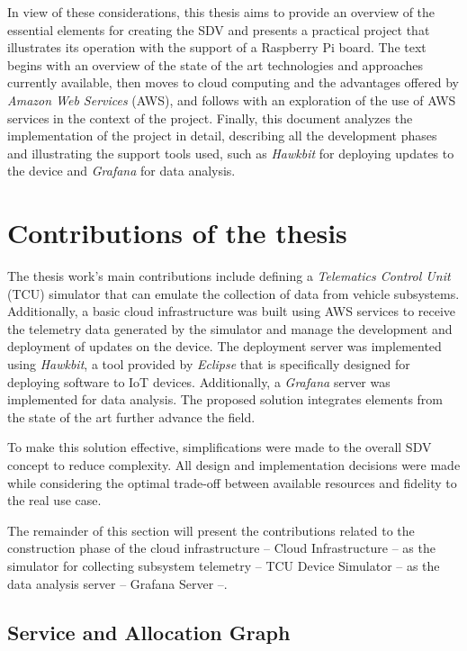 \documentclass[10pt,a4paper,roman, twocolumn]{article}
\begin{document}
In view of these considerations, this thesis aims to provide an overview of the essential elements for creating the SDV and presents a practical project that illustrates its operation with the support of a Raspberry Pi board. The text begins with an overview of the state of the art technologies and approaches currently available, then moves to cloud computing and the advantages offered by \textit{Amazon Web Services} (AWS), and follows with an exploration of the use of AWS services in the context of the project. Finally, this document analyzes the implementation of the project in detail, describing all the development phases and illustrating the support tools used, such as \textit{Hawkbit} for deploying updates to the device and \textit{Grafana} for data analysis.

\section{Contributions of the thesis}

The thesis work's main contributions include defining a \textit{Telematics Control Unit} (TCU) simulator that can emulate the collection of data from vehicle subsystems. Additionally, a basic cloud infrastructure was built using AWS services to receive the telemetry data generated by the simulator and manage the development and deployment of updates on the device. The deployment server was implemented using \textit{Hawkbit}, a tool provided by \textit{Eclipse} that is specifically designed for deploying software to IoT devices. Additionally, a \textit{Grafana} server was implemented for data analysis. The proposed solution integrates elements from the state of the art further advance the field.

To make this solution effective, simplifications were made to the overall SDV concept to reduce complexity. All design and implementation decisions were made while considering the optimal trade-off between available resources and fidelity to the real use case.

The remainder of this section will present the contributions related to the construction phase of the cloud infrastructure -- Cloud Infrastructure -- as the simulator for collecting subsystem telemetry -- TCU Device Simulator -- as the data analysis server -- Grafana Server --. 

\subsection{Service and Allocation Graph}
\end{document}
